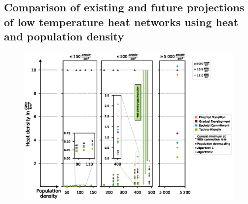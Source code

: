 \subsection{Comparison of existing and future projections of low temperature heat networks using heat and population density}\label{res:5}

\begin{figure}
	\centering
	\includegraphics[width=1\linewidth]{figures/4_Results/Heat_density_gap.eps}
	\caption{}
	\label{fig:res4}
\end{figure}
















